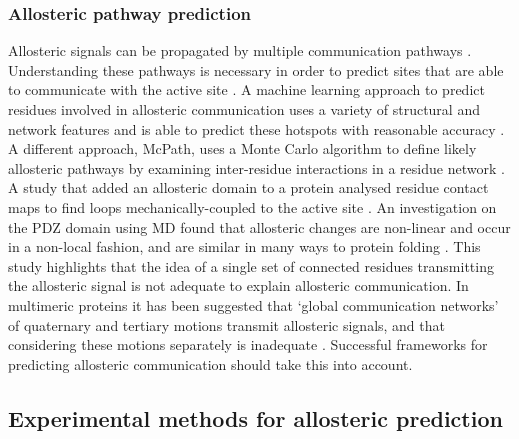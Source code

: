 \subsubsection{Allosteric pathway prediction}

Allosteric signals can be propagated by multiple communication pathways \cite{DelSol2009}.
Understanding these pathways is necessary in order to predict sites that are able to communicate with the active site \cite{Dokholyan2016}.
A machine learning approach to predict residues involved in allosteric communication uses a variety of structural and network features and is able to predict these hotspots with reasonable accuracy \cite{Demerdash2009}.
A different approach, McPath, uses a Monte Carlo algorithm to define likely allosteric pathways by examining inter-residue interactions in a residue network \cite{Kaya2013}.
A study that added an allosteric domain to a protein analysed residue contact maps to find loops mechanically-coupled to the active site \cite{Dagliyan2016}.
An investigation on the PDZ domain using MD found that allosteric changes are non-linear and occur in a non-local fashion, and are similar in many ways to protein folding \cite{Buchenberg2017}.
This study highlights that the idea of a single set of connected residues transmitting the allosteric signal is not adequate to explain allosteric communication.
In multimeric proteins it has been suggested that `global communication networks' of quaternary and tertiary motions transmit allosteric signals, and that considering these motions separately is inadequate \cite{Daily2009}.
Successful frameworks for predicting allosteric communication should take this into account.


\subsection{Experimental methods for allosteric prediction}

